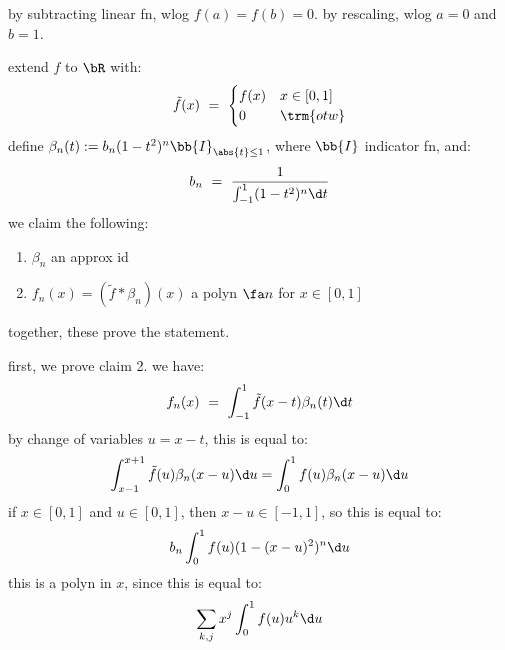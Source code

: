 \begin{pf}[source=Primary Source Material]
	by subtracting linear fn, wlog $f(a)=f(b)=0$.
	by rescaling, wlog $a=0$ and $b=1$.

	extend $f$ to $\bR$ with:
	\begin{equation*}
		\tilde{f}(x) \ = \
		\begin{cases}
			f(x) & x\in[0,1] \\ 0 & \trm{otw}
		\end{cases}
	\end{equation*}
	define $\beta_{n}(t):=b_{n}(1-t^{2})^{n}\bb{I}_{\abs{t}\leq1}$,
	where $\bb{I}$ indicator fn, and:
	\begin{equation*}
		b_{n} \ = \ \frac{1}{\int_{-1}^{1}(1-t^{2})^{n}\d t}
	\end{equation*}
	we claim the following:
	\begin{enumerate}[(1),itemsep=0pt]
		\item $\beta_{n}$ an approx id
		\item $f_{n}(x)=(\tilde{f}*\beta_{n})(x)$ a polyn $\fa n$ for $x\in[0,1]$
	\end{enumerate}
	together, these prove the statement.

	first, we prove claim 2. we have:
	\begin{equation*}
		f_{n}(x) \ = \ \int_{-1}^{1}\tilde{f}(x-t)\beta_{n}(t)\d t
	\end{equation*}
	by change of variables $u=x-t$, this is equal to:
	\begin{equation*}
		\int_{x-1}^{x+1}\tilde{f}(u)\beta_{n}(x-u)\d u
		= \int_{0}^{1}f(u)\beta_{n}(x-u)\d u
	\end{equation*}
	if $x\in[0,1]$ and $u\in[0,1]$, then $x-u\in[-1,1]$, so this is equal to:
	\begin{equation*}
		b_{n}\int_{0}^{1}f(u)(1-(x-u)^{2})^{n}\d u
	\end{equation*}
	this is a polyn in $x$, since this is equal to:
	\begin{equation*}
		\sum_{k,j}x^{j}\int_{0}^{1}f(u)u^{k}\d u
	\end{equation*}


\end{pf}
